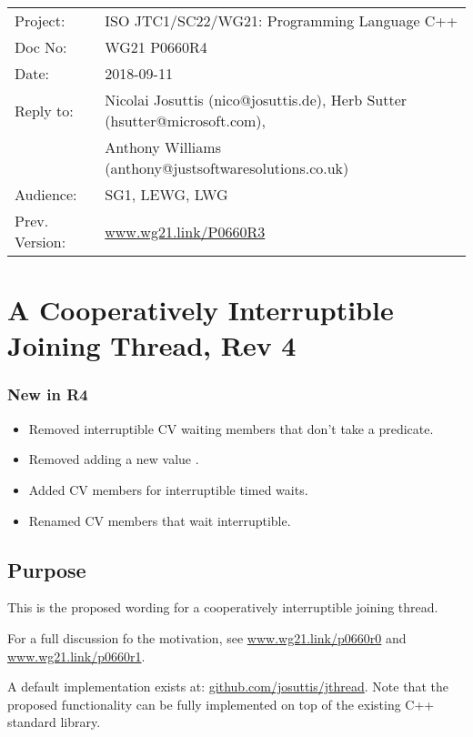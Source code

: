 
{\small
\begin{tabular}{@{}ll}
Project:  	& ISO JTC1/SC22/WG21: Programming Language C++ \\
Doc No: 	& WG21 P0660R4 \\
Date: 		& 2018-09-11 \\
Reply to: 	& Nicolai Josuttis (nico@josuttis.de), Herb Sutter (hsutter@microsoft.com), \\
                &         Anthony Williams (anthony@justsoftwaresolutions.co.uk) \\
Audience: 	& SG1, LEWG, LWG \\
Prev. Version:	& \url{www.wg21.link/P0660R3} \\
\end{tabular}
}

\section*{{\huge{}A Cooperatively Interruptible Joining Thread, Rev 4}}

\subsubsection*{New in R4}
\begin{itemize}
 \item Removed interruptible CV waiting members that don't take a predicate.
 \item Removed adding a new  value .
 \item Added CV members for interruptible timed waits.
 \item Renamed CV members that wait interruptible.
\end{itemize}

\subsection*{Purpose}

This is the proposed wording for a cooperatively interruptible joining thread.

For a full discussion fo the motivation, see
\url{www.wg21.link/p0660r0} and
\url{www.wg21.link/p0660r1}.

A default implementation exists at:
\url{github.com/josuttis/jthread}.
Note that the proposed functionality can be fully implemented 
on top of the existing C++ standard library.

